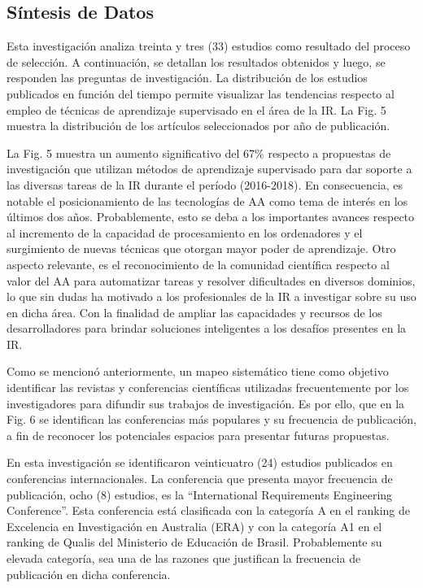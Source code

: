 \documentclass[journal]{IEEEtran}
\begin{document}
\subsection{Síntesis de Datos }

Esta investigación analiza treinta y tres (33) estudios como resultado del proceso de selección. A continuación, se detallan los resultados obtenidos y luego, se responden las preguntas de investigación.
La distribución de los estudios publicados en función del tiempo permite visualizar las tendencias respecto al empleo de técnicas de aprendizaje supervisado en el área de la IR. La Fig. 5 muestra la distribución de los artículos seleccionados por año de publicación.

La Fig. 5 muestra un aumento significativo del 67\% respecto a propuestas de investigación que utilizan métodos de aprendizaje supervisado para dar soporte a las diversas tareas de la IR durante el período (2016-2018). En consecuencia, es notable el posicionamiento de las tecnologías de AA como tema de interés en los últimos dos años. Probablemente, esto se deba a los importantes avances respecto al incremento de la capacidad de procesamiento en los ordenadores y el surgimiento de nuevas técnicas que otorgan mayor poder de aprendizaje. Otro aspecto relevante, es el reconocimiento de la comunidad científica respecto al valor del AA para automatizar tareas y resolver dificultades en diversos dominios, lo que sin dudas ha motivado a los profesionales de la IR a investigar sobre su uso en dicha área. Con la finalidad de ampliar las capacidades y recursos de los desarrolladores para brindar soluciones inteligentes a los desafíos presentes en la IR. 

Como se mencionó anteriormente, un mapeo sistemático tiene como objetivo identificar las revistas y conferencias científicas utilizadas frecuentemente por los investigadores para difundir sus trabajos de investigación. Es por ello, que en la Fig. 6 se identifican las conferencias más populares y su frecuencia de publicación, a fin de reconocer los potenciales espacios para presentar futuras propuestas. 

En esta investigación se identificaron veinticuatro (24) estudios publicados en conferencias internacionales. La conferencia que presenta mayor frecuencia de publicación, ocho (8) estudios, es la “International Requirements Engineering Conference”. Esta conferencia está clasificada con la categoría A en el ranking de Excelencia en Investigación en Australia (ERA) y con la categoría A1 en el ranking de Qualis del Ministerio de Educación de Brasil. Probablemente su elevada categoría, sea una de las razones que justifican la frecuencia de publicación en dicha conferencia. 
\end{document}
